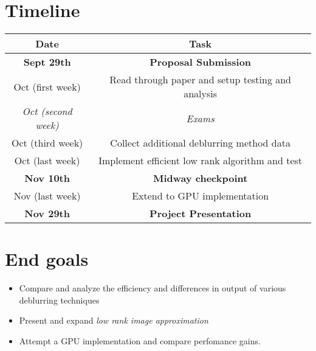 \section{Timeline}\label{timeline}

\begin{longtable}[]{@{}cc@{}}
\toprule
Date & Task\tabularnewline
\midrule
\endhead
\textbf{Sept 29th} & \textbf{Proposal Submission}\tabularnewline
Oct (first week) & Read through paper and setup testing and
analysis\tabularnewline
\emph{Oct (second week)} & \emph{Exams}\tabularnewline
Oct (third week) & Collect additional deblurring method
data\tabularnewline
Oct (last week) & Implement efficient low rank algorithm and
test\tabularnewline
\textbf{Nov 10th} & \textbf{Midway checkpoint}\tabularnewline
Nov (last week) & Extend to GPU implementation\tabularnewline
\textbf{Nov 29th} & \textbf{Project Presentation}\tabularnewline
\bottomrule
\end{longtable}

\section{End goals}\label{end-goals}

\begin{itemize}
\tightlist
\item
  Compare and analyze the efficiency and differences in output of
  various deblurring techniques
\item
  Present and expand \emph{low rank image approximation}
\item
  Attempt a GPU implementation and compare perfomance gains.
\end{itemize}

